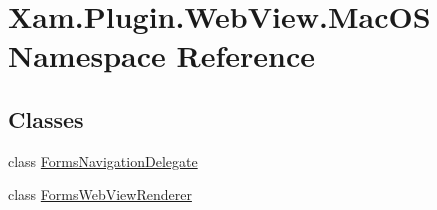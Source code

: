 \hypertarget{namespace_xam_1_1_plugin_1_1_web_view_1_1_mac_o_s}{}\section{Xam.\+Plugin.\+Web\+View.\+Mac\+OS Namespace Reference}
\label{namespace_xam_1_1_plugin_1_1_web_view_1_1_mac_o_s}
\subsection*{Classes}
\begin{DoxyCompactItemize}
\item 
class \hyperlink{class_xam_1_1_plugin_1_1_web_view_1_1_mac_o_s_1_1_forms_navigation_delegate}{Forms\+Navigation\+Delegate}
\item 
class \hyperlink{class_xam_1_1_plugin_1_1_web_view_1_1_mac_o_s_1_1_forms_web_view_renderer}{Forms\+Web\+View\+Renderer}
\end{DoxyCompactItemize}
